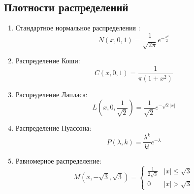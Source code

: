\documentclass[a4]{article}
\begin{document}
\subsection{Плотности распределений}
\begin{enumerate}
\item Стандартное нормальное распределения \cite{distr_formulas}: 
	\begin{equation}\label{eqn:normal}
	N(x,0,1) = \frac{1}{\sqrt{2\pi}}e^{-\frac{x^2}{2}}
	\end{equation} 
\item Распределение Коши\cite{distr_formulas}: 
	\begin{equation}\label{eqn:cauchy}
	 C(x,0,1) = \frac{1}{\pi(1+x^2)}
	 \end{equation}
\item Распределение Лапласа\cite{distr_formulas}: 
	 \begin{equation}\label{eqn:laplace}
	 L\left( x,0,\frac{1}{\sqrt{2}}\right) = \frac{1}{\sqrt{2}}e^{-\sqrt{2}\vert x\vert}
	 \end{equation}
\item Распределение Пуассона\cite{distr_formulas}:
	 \begin{equation}\label{eqn:poisson}
	 P(\lambda,k) = \frac{\lambda^k}{k!}e^{-\lambda}
	\end{equation}  
\item Равномерное распределение\cite{distr_formulas}: 
	\begin{equation}\label{eqn:uniform}
	M(x,-\sqrt{3}, \sqrt{3}) = 
	 \begin{cases}
	   \frac{1}{2\sqrt{3}} &\vert x\vert \leqslant \sqrt{3}\\
	   0 &\vert x\vert > \sqrt{3}
	 \end{cases}
\end{equation}
\end{enumerate}
\end{document}
